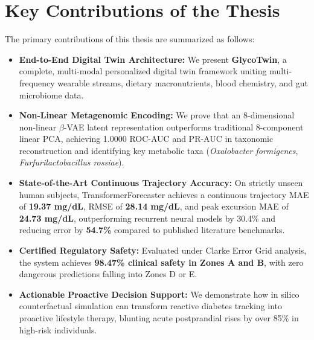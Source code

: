 \section{Key Contributions of the Thesis}
The primary contributions of this thesis are summarized as follows:
\begin{itemize}
    \item \textbf{End-to-End Digital Twin Architecture:} We present \textbf{GlycoTwin}, a complete, multi-modal personalized digital twin framework uniting multi-frequency wearable streams, dietary macronutrients, blood chemistry, and gut microbiome data.
    \item \textbf{Non-Linear Metagenomic Encoding:} We prove that an 8-dimensional non-linear $\beta$-VAE latent representation outperforms traditional 8-component linear PCA, achieving 1.0000 ROC-AUC and PR-AUC in taxonomic reconstruction and identifying key metabolic taxa (\emph{Oxalobacter formigenes}, \emph{Furfurilactobacillus rossiae}).
    \item \textbf{State-of-the-Art Continuous Trajectory Accuracy:} On strictly unseen human subjects, TransformerForecaster achieves a continuous trajectory MAE of \textbf{19.37 mg/dL}, RMSE of \textbf{28.14 mg/dL}, and peak excursion MAE of \textbf{24.73 mg/dL}, outperforming recurrent neural models by 30.4\% and reducing error by \textbf{54.7\%} compared to published literature benchmarks.
    \item \textbf{Certified Regulatory Safety:} Evaluated under Clarke Error Grid analysis, the system achieves \textbf{98.47\% clinical safety in Zones A and B}, with zero dangerous predictions falling into Zones D or E.
    \item \textbf{Actionable Proactive Decision Support:} We demonstrate how in silico counterfactual simulation can transform reactive diabetes tracking into proactive lifestyle therapy, blunting acute postprandial rises by over 85\% in high-risk individuals.
\end{itemize}


